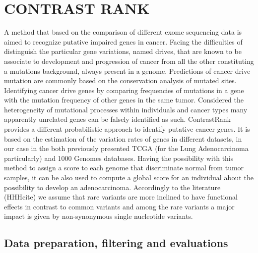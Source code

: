 \section{CONTRAST RANK}
A method that based on the comparison of different exome sequencing data is aimed to recognize putative impaired genes in cancer. Facing the difficulties of distinguish the particular gene variations, named drives, that are known to be associate to development and progression of cancer from all the other constituting a mutations background, always present in a genome. Predictions of cancer drive mutation are commonly based on the conservation analysis of mutated sites. Identifying cancer drive genes by comparing frequencies of mutations in a gene with the mutation frequency of other genes in the same tumor. Considered the heterogeneity of mutational processes within individuals and cancer types many apparently unrelated genes can be falsely identified as such.   
ContrastRank provides a different probabilistic approach to identify putative cancer genes. It is based on the estimation of the variation rates of genes in different datasets, in our case in the both previously presented TCGA (for the Lung Adenocarcinoma particularly) and 1000 Genomes databases. Having the possibility with this method to assign a score to each genome that discriminate normal from tumor samples, it can be also used to compute a global score for an individual about the possibility to develop an adenocarcinoma.
Accordingly to the literature (HHHcite) we assume that rare variants are more inclined to have functional effects in contrast to common variants and among the rare variants a major impact is given by non-synonymous single nucleotide variants.


\subsection{Data preparation, filtering and evaluations}


